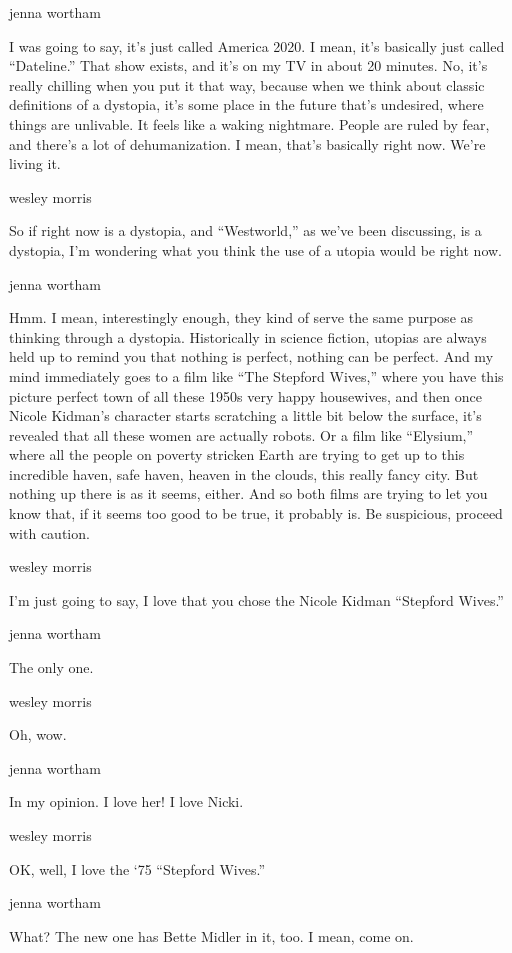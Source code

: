 jenna wortham

I was going to say, it's just called America 2020. I mean, it's
basically just called ``Dateline.'' That show exists, and it's on my TV
in about 20 minutes. No, it's really chilling when you put it that way,
because when we think about classic definitions of a dystopia, it's some
place in the future that's undesired, where things are unlivable. It
feels like a waking nightmare. People are ruled by fear, and there's a
lot of dehumanization. I mean, that's basically right now. We're living
it.

wesley morris

So if right now is a dystopia, and ``Westworld,'' as we've been
discussing, is a dystopia, I'm wondering what you think the use of a
utopia would be right now.

jenna wortham

Hmm. I mean, interestingly enough, they kind of serve the same purpose
as thinking through a dystopia. Historically in science fiction, utopias
are always held up to remind you that nothing is perfect, nothing can be
perfect. And my mind immediately goes to a film like ``The Stepford
Wives,'' where you have this picture perfect town of all these 1950s
very happy housewives, and then once Nicole Kidman's character starts
scratching a little bit below the surface, it's revealed that all these
women are actually robots. Or a film like ``Elysium,'' where all the
people on poverty stricken Earth are trying to get up to this incredible
haven, safe haven, heaven in the clouds, this really fancy city. But
nothing up there is as it seems, either. And so both films are trying to
let you know that, if it seems too good to be true, it probably is. Be
suspicious, proceed with caution.

wesley morris

I'm just going to say, I love that you chose the Nicole Kidman
``Stepford Wives.''

jenna wortham

The only one.

wesley morris

Oh, wow.

jenna wortham

In my opinion. I love her! I love Nicki.

wesley morris

OK, well, I love the `75 ``Stepford Wives.''

jenna wortham

What? The new one has Bette Midler in it, too. I mean, come on.

